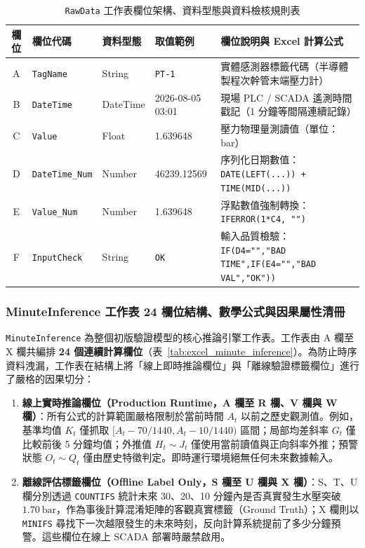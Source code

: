 \documentclass[fontset=none, a4paper, 12pt]{ctexart}
\begin{document}
\begin{doublespace}
\begin{table}[H]
\centering
\caption{\texttt{RawData} 工作表欄位架構、資料型態與資料檢核規則表}
\label{tab:excel_rawdata}
\footnotesize
\renewcommand{\arraystretch}{1.2}
\setlength{\tabcolsep}{5pt}
\begin{tabularx}{0.96\textwidth}{clllX}
\toprule
\textbf{欄位} & \textbf{欄位代碼} & \textbf{資料型態} & \textbf{取值範例} & \textbf{欄位說明與 Excel 計算公式} \\
\midrule
A & \texttt{TagName} & String & \texttt{PT-1} & 實體感測器標籤代碼（半導體製程次幹管末端壓力計） \\
B & \texttt{DateTime} & DateTime & 2026-08-05 03:01 & 現場 PLC / SCADA 遙測時間戳記（1 分鐘等間隔連續記錄） \\
C & \texttt{Value} & Float & 1.639648 & 壓力物理量測讀值（單位：bar） \\
D & \texttt{DateTime\_Num} & Number & 46239.12569 & 序列化日期數值：\texttt{DATE(LEFT(...)) + TIME(MID(...))} \\
E & \texttt{Value\_Num} & Number & 1.639648 & 浮點數值強制轉換：\texttt{IFERROR(1*C4, "")} \\
F & \texttt{InputCheck} & String & \texttt{OK} & 輸入品質檢驗：\texttt{IF(D4="","BAD TIME",IF(E4="","BAD VAL","OK"))} \\
\bottomrule
\end{tabularx}
\end{table}

\subsubsection{MinuteInference 工作表 24 欄位結構、數學公式與因果屬性清冊}
\label{sec:minute_inference_24cols}
\texttt{MinuteInference} 為整個初版驗證模型的核心推論引擎工作表。工作表由 A 欄至 X 欄共編排 \textbf{24 個連續計算欄位}（表~\ref{tab:excel_minute_inference}）。為防止時序資料洩漏，工作表在結構上將「線上即時推論欄位」與「離線驗證標籤欄位」進行了嚴格的因果切分：
\begin{enumerate}
    \item \textbf{線上實時推論欄位（Production Runtime，A 欄至 R 欄、V 欄與 W 欄）}：所有公式的計算範圍嚴格限制於當前時間 $A_t$ 以前之歷史觀測值。例如，基準均值 $K_t$ 僅抓取 $[A_t - 70/1440, A_t - 10/1440)$ 區間；局部均差斜率 $G_t$ 僅比較前後 5 分鐘均值；外推值 $H_t \sim J_t$ 僅使用當前讀值與正向斜率外推；預警狀態 $O_t \sim Q_t$ 僅由歷史特徵判定。即時運行環境絕無任何未來數據輸入。
    \item \textbf{離線評估標籤欄位（Offline Label Only，S 欄至 U 欄與 X 欄）}：S、T、U 欄分別透過 \texttt{COUNTIFS} 統計未來 30、20、10 分鐘內是否真實發生水壓突破 $1.70\ \mathrm{bar}$，作為事後計算混淆矩陣的客觀真實標籤（Ground Truth）；X 欄則以 \texttt{MINIFS} 尋找下一次越限發生的未來時刻，反向計算系統提前了多少分鐘預警。這些欄位在線上 SCADA 部署時嚴禁啟用。
\end{enumerate}


\end{doublespace}
\end{document}
